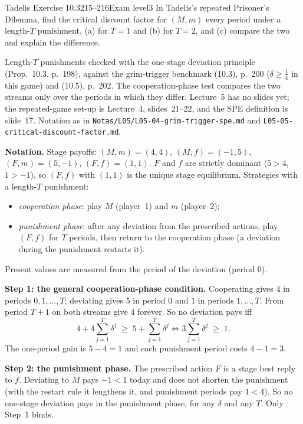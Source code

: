 \begin{exsol}{Tadelis Exercise 10.3}{215--216}{Exam level}{3}
\asked In Tadelis's repeated Prisoner's Dilemma, find the critical discount factor for $(M,m)$
every period under a length-$T$ punishment, (a) for $T = 1$ and (b) for $T = 2$, and (c) compare the
two and explain the difference.

\method Length-$T$ punishments checked with the one-stage deviation principle (Prop.~10.3,
p.~198), against the grim-trigger benchmark (10.3), p.~200 ($\delta \ge \frac14$ in this game) and
(10.5), p.~202. The cooperation-phase test compares the two streams only over the periods in which
they differ. Lecture~5 has no slides yet; the repeated-game set-up is Lecture~4, slides~21--22, and
the SPE definition is slide~17. Notation as in \texttt{Notas/L05/L05-04-grim-trigger-spe.md} and
\texttt{L05-05-critical-discount-factor.md}.

\solution
\textbf{Notation.} Stage payoffs: $(M,m) = (4,4)$, $(M,f) = (-1,5)$, $(F,m) = (5,-1)$, $(F,f) =
(1,1)$. $F$ and $f$ are strictly dominant ($5 > 4$, $1 > -1$), so $(F,f)$ with $(1,1)$ is the unique
stage equilibrium. Strategies with a length-$T$ punishment:
\begin{itemize}
  \item \emph{cooperation phase}: play $M$ (player~1) and $m$ (player~2);
  \item \emph{punishment phase}: after any deviation from the prescribed actions, play $(F,f)$ for
  $T$ periods, then return to the cooperation phase (a deviation during the punishment restarts it).
\end{itemize}
Present values are measured from the period of the deviation (period 0).

\textbf{Step 1: the general cooperation-phase condition.} Cooperating gives $4$ in periods
$0, 1, \dots, T$; deviating gives $5$ in period 0 and $1$ in periods $1, \dots, T$. From period $T+1$
on both streams give $4$ forever. So no deviation pays iff
\[
  4 + 4\sum_{j=1}^{T}\delta^j \;\ge\; 5 + \sum_{j=1}^{T}\delta^j
  \iff 3\sum_{j=1}^{T}\delta^j \;\ge\; 1 .
\]
The one-period gain is $5 - 4 = 1$ and each punishment period costs $4 - 1 = 3$.

\textbf{Step 2: the punishment phase.} The prescribed action $F$ is a stage best reply to $f$.
Deviating to $M$ pays $-1 < 1$ today and does not shorten the punishment (with the restart rule it
lengthens it, and punishment periods pay $1 < 4$). So no one-stage deviation pays in the punishment
phase, for any $\delta$ and any $T$. Only Step~1 binds.


\end{exsol}
